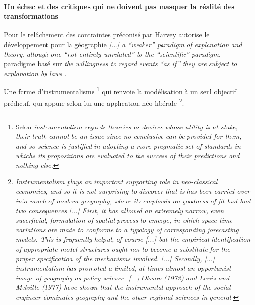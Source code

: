\paragraph{Un échec et des critiques qui ne doivent pas masquer la réalité des transformations}
\label{p:echec_critiques}


Pour \textcite[41]{Gregory1978} le relâchement des contraintes préconisé par Harvey \autocite[47]{Paterson1984} autorise le développement pour la géographie \textit{[...] a \enquote{weaker} paradigm of explanation and theory, altough one \enquote{not entirely unrelated} to the \enquote{scientific} paradigm}, paradigme basé sur \textit{the willingness to regard events \enquote{as if} they are subject to explanation by laws \autocite[174]{Harvey1969}}. 

Une forme d'instrumentalisme \footnote{Selon \textcite{Gregory1978} \textit{instrumentalism regards theories as devices whose utility is at stake; their truth cannot be an issue since no conclusive can be provided for them, and so science is justified in adopting a more pragmatic set of standards in whichs its propositions are evaluated to the success of their predictions and nothing else.}} qui renvoie la modélisation à un seul objectif prédictif, qui appuie selon lui une application néo-libérale \footnote{\textit{Instrumentalism plays an important supporting role in neo-classical economics, and so it is not surprising to discover that is has been carried over into much of modern geography, where its emphasis on \textit{goodness of fit} had had two consequences [...] First, it has allowed an extremely narrow, even superficial, formulation of spatial process to emerge, in which space-time variations are made to conforme to a typology of corresponding forecasting models. This is frequently helpul, of course [...] but the empirical identification of appropriate model structures ought not to become a substitute for the proper specification of the mechanisms involved. [...] Secondly, [...] instrumentalism has promoted a limited, at times almost an opportunist, image of geography as policy science. [...] Olsson (1972) and Lewis and Melville (1977) have shown that the instrumental approach of the social engineer dominates geography and the other regional sciences \textit{in general} \autocite[41]{Gregory1978}}}.


